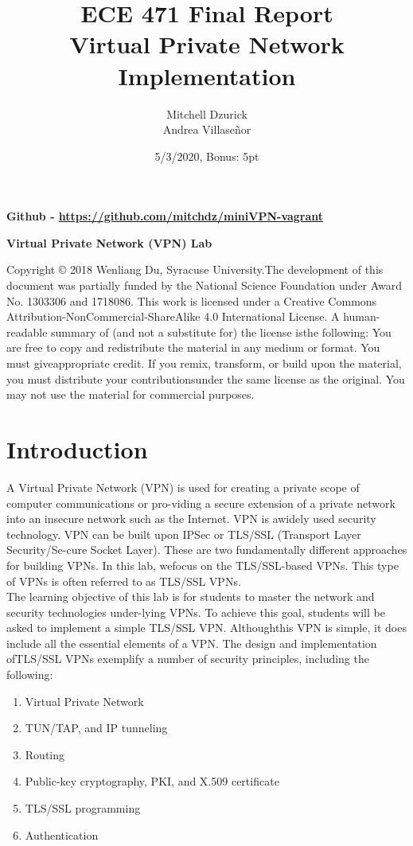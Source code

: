 \documentclass[12pt]{article}
\title {{\bf ECE 471 Final Report} \\
\large{Virtual Private Network Implementation}}
\author{Mitchell Dzurick\\Andrea Villaseñor}
\date{5/3/2020, Bonus: 5pt}
\newcommand\tab[1][0.5cm]{\hspace*{#1}}
\begin{document}
\maketitle
\textbf{Github - \url{https://github.com/mitchdz/miniVPN-vagrant}}
\\
\tableofcontents 
\clearpage



\begin{center}
    \textbf{Virtual Private Network (VPN) Lab}
\end{center}

Copyright © 2018  Wenliang Du, Syracuse University.The development of this document was partially funded by the National Science Foundation under Award No. 1303306 and 1718086.  This work is licensed under a Creative Commons Attribution-NonCommercial-ShareAlike 4.0 International License. A human-readable summary of (and not a substitute for) the license isthe following:  You are free to copy and redistribute the material in any medium or format.  You must giveappropriate credit. If you remix, transform, or build upon the material, you must distribute your contributionsunder the same license as the original. You may not use the material for commercial purposes.

\section{Introduction}
A Virtual Private Network (VPN) is used for creating a private scope of computer communications or pro-viding a secure extension of a private network into an insecure network such as the Internet.   VPN is awidely used security technology.  VPN can be built upon IPSec or TLS/SSL (Transport Layer Security/Se-cure Socket Layer).  These are two fundamentally different approaches for building VPNs.  In this lab, wefocus on the TLS/SSL-based VPNs. This type of VPNs is often referred to as TLS/SSL VPNs. \\
\tab The learning objective of this lab is for students to master the network and security technologies under-lying VPNs.  To achieve this goal, students will be asked to implement a simple TLS/SSL VPN. Althoughthis VPN is simple, it does include all the essential elements of a VPN. The design and implementation ofTLS/SSL VPNs exemplify a number of security principles, including the following:

\begin{enumerate}
    \item Virtual Private Network
    \item TUN/TAP, and IP tunneling
    \item Routing
    \item Public-key cryptography, PKI, and X.509 certificate
    \item TLS/SSL programming
    \item Authentication
\end{enumerate}
\end{document}
